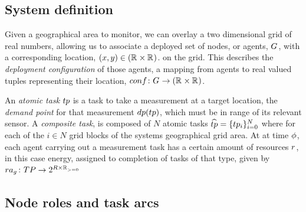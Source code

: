 \subsection{System definition}
Given a geographical area to monitor, we can overlay a two dimensional grid of real numbers, allowing us to associate a deployed set of nodes, or agents, $G_{}^{}$, with a corresponding location, $(x,y) \in (\mathbb{R}_{}^{} \times \mathbb{R}_{}^{})$. on the grid. This describes the \textit{deployment configuration} of those agents, a mapping from agents to real valued tuples representing their location,  $\formalDeployment{}{}$.

An \textit{atomic task} $\varAtomicTask{}{}$ is a task to take a measurement at a target location, the \textit{demand point} for that measurement $\functionTaskDemandPoint{}{}$, which must be in range of its relevant sensor. A \textit{composite task}, is composed of $N$ atomic tasks $\varCompositeTask{}{} = \lbrace \varAtomicTask{i}{} \rbrace_{i=0}^N$ where for each of the $i\in N$ grid blocks of the systems geographical grid area. At at time $\phi$, each agent carrying out a measurement task has a certain amount of resources $\varResource{}{}$, in this case energy, assigned to completion of tasks of that type, given by $\formalTaskResourceAllocation{}{}$

\subsection{Node roles and task arcs}
\newcommand{\formalSinkRole}[2]{
	\functionFormal{sink}
	{\setAtomicTask{}{} \times \setAgents{}{}}
	{\powerSetAgents{}{}}
}
\newcommand{\formalSenseRole}[2]{
	\functionFormal{sense}
	{\setAtomicTask{}{} \times \setAgents{}{}}
	{\powerSetAgents{}{}}
}
\newcommand{\formalActiveRole}[2]{
	\functionFormal{active}
	{\setAtomicTask{}{} \times \setAgents{}{}}
	{\powerSetAgents{}{}}
}
\newcommand{\formalIdleRole}[2]{
	\functionFormal{idle_{\setTime{}{}}}
	{\setAgents{}{}}
	{\setAgents{}{}}
}
\newcommand{\formalSleepRole}[2]{
	\functionFormal{sink_{\setTime{}{}}}
	{\setAgents{}{}}
	{\setAgents{}{}}
}
\newcommand{\functionSinkRole}[2]{\functionSignature{sink}{\varAtomicTask{}{}, \setAgents{}{}}}
	
\newcommand{\functionSenseRole}[2]{\functionSignature{sense}{\varAtomicTask{}{}, \setAgents{}{}}}
\newcommand{\functionActiveRole}[2]{\functionSignature{active}{\varAtomicTask{}{}, \setAgents{}{}}}
\newcommand{\functionIdleRole}[2]{\functionSignature{idle}{\varAtomicTask{}{}, \setAgents{}{}}}
\newcommand{\functionSleepRole}[2]{\functionSignature{sleep}{\varAtomicTask{}{}, \setAgents{}{}}}

